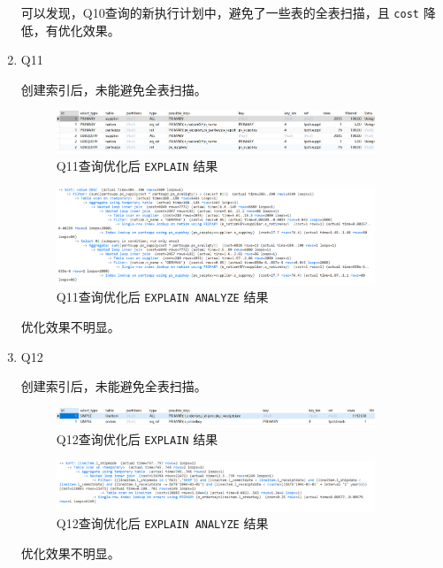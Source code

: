 \documentclass{article}
\renewcommand\tt{\texttt}
\begin{document}
\begin{enumerate}
可以发现，Q10查询的新执行计划中，避免了一些表的全表扫描，且 \tt{cost} 降低，有优化效果。

  \item Q11
  
创建索引后，未能避免全表扫描。

\begin{figure}[H]
\centering
\includegraphics[width=0.9\textwidth]{img/65.png}
\caption{Q11查询优化后 \tt{EXPLAIN} 结果}
\end{figure}

\begin{figure}[H]
\centering
\includegraphics[width=0.9\textwidth]{img/66.png}
\caption{Q11查询优化后 \tt{EXPLAIN ANALYZE} 结果}
\end{figure}

优化效果不明显。

  \item Q12
  
创建索引后，未能避免全表扫描。

\begin{figure}[H]
\centering
\includegraphics[width=0.9\textwidth]{img/67.png}
\caption{Q12查询优化后 \tt{EXPLAIN} 结果}
\end{figure}

\begin{figure}[H]
\centering
\includegraphics[width=0.9\textwidth]{img/68.png}
\caption{Q12查询优化后 \tt{EXPLAIN ANALYZE} 结果}
\end{figure}

优化效果不明显。


\end{enumerate}
\end{document}
